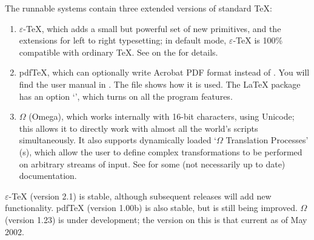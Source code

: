 \documentclass{article}
\def\eTeX{$\varepsilon$-\TeX}
\def\OMEGA{$\Omega$}
\begin{document}
The \TeXLive{} runnable systems contain three extended versions of 
standard \TeX:
\begin{enumerate}
\item \eTeX, which adds a small but powerful set of new primitives,
  and the \TeXXeT{} extensions for left to right typesetting; in
  default mode, \eTeX{} is 100\% compatible with ordinary \TeX. See
  on the \CD{} for details.
\item pdf\TeX, which can optionally write Acrobat PDF format instead
  of \dvi{}. You will find the user manual in
  . The
  file  shows how it is
  used. The \LaTeX{}  package has an option
  `', which turns on all the program features.
\item \OMEGA{} (Omega), which works internally with 16-bit characters,
  using Unicode; this allows it to directly work with almost all the
  world's scripts simultaneously. It also supports dynamically loaded
  `\OMEGA{} Translation Processes' (s), which allow the user
  to define complex transformations to be performed on arbitrary
  streams of input. See  for some
  (not necessarily up to date) documentation.
\end{enumerate} 
\eTeX{} (version 2.1) is stable, although subsequent releases will add
new functionality.  pdf\TeX{} (version 1.00b) is also stable,
but is still being improved. 
\OMEGA{} (version 1.23) is under development; the version
on this \CD{} is that current as of May 2002. 
\end{document}
